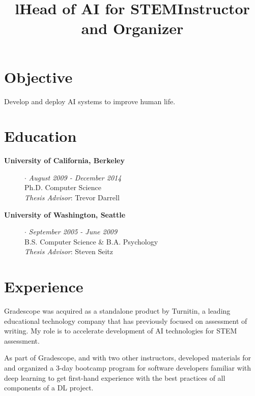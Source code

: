 \documentclass[line, margin]{res}
\title{l}\\
\begin{document}
\newsectionwidth{1in}

\address{\small{\textcolor{MidnightBlue}{https://sergeykarayev.com} $\cdot$ \textcolor{MidnightBlue}{sergeykarayev@gmail.com} $\cdot$ Updated 2018 October 6}}

\begin{resume}
\section{\sc Objective}
Develop and deploy AI systems to improve human life.

\section{\sc Education}
\begin{description}
\item[{\bf University of California, Berkeley}] $\cdot$ {\it August 2009 - December 2014}
\\Ph.D. Computer Science
\\\emph{Thesis Advisor}: Trevor Darrell

\item[{\bf University of Washington, Seattle}] $\cdot$ {\it September 2005 - June 2009}
\\B.S. Computer Science \& B.A. Psychology
\\\emph{Thesis Advisor}: Steven Seitz
\end{description}

\section{\sc Experience}

\title{\bf Head of AI for STEM}
\begin{position}
Gradescope was acquired as a standalone product by Turnitin, a leading educational technology company that has previously focused on assessment of writing.
My role is to accelerate development of AI technologies for STEM assessment.
\end{position}

\title{\bf Instructor and Organizer}
\begin{position}
As part of Gradescope, and with two other instructors, developed materials for and organized a 3-day bootcamp program for software developers familiar with deep learning to get first-hand experience with the best practices of all components of a DL project.
\end{position}


\end{resume}
\end{document}
